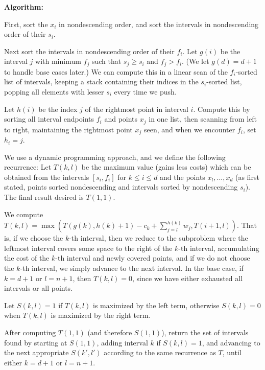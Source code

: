 \documentclass[letterpaper,12pt]{article}
\begin{document}
\vspace{2mm}
\textbf{Algorithm:}

First, sort the $x_i$ in nondescending order, and sort the intervals in
nondescending order of their $s_i$.

Next sort the intervals in nondescending order of their $f_i$. Let $g(i)$ be the
interval $j$ with minimum $f_j$ such that $s_j \geq s_i$ and $f_j > f_i$. (We let
$g(d) = d + 1$ to handle base cases later.) We can compute this in a linear scan
of the $f_i$-sorted list of intervals, keeping a stack containing their indices
in the $s_i$-sorted list, popping all elements with lesser $s_i$ every time we
push.

Let $h(i)$ be the index $j$ of the rightmost point in interval $i$. Compute this
by sorting all interval endpoints $f_i$ and points $x_j$ in one list, then
scanning from left to right, maintaining the rightmost point $x_j$ seen, and
when we encounter $f_i$, set $h_i = j$.


We use a dynamic programming approach, and we define the following recurrence:
Let $T(k, l)$ be the maximum value (gains less costs) which can be obtained from
the intervals $[s_i,f_i]$ for $k \leq i \leq d$ and the points ${x_l,...,x_d}$ (as
first stated, points sorted nondescending and intervals sorted by nondescending
$s_i$). The final result desired is $T(1,1)$.

We compute $T(k,l) = \max (T(g(k), h(k) + 1) - c_k + \sum_{j=l}^{h(k)} w_j, T(i+1,
l))$. That is, if we choose the $k$-th interval, then we reduce to the
subproblem where the leftmost interval covers some space to the right of the
$k$-th interval, accumulating the cost of the $k$-th interval and newly covered
points, and if we do not choose the $k$-th interval, we simply advance to the
next interval. In the base case, if $k = d + 1$ or $l = n + 1$, then $T(k,l) =
0$, since we have either exhausted all intervals or all points.

Let $S(k,l) = 1$ if $T(k,l)$ is maximized by the left term, otherwise $S(k,l) =
0$ when $T(k,l)$ is maximized by the right term.

After computing $T(1,1)$ (and therefore $S(1,1)$), return the set of intervals
found by starting at $S(1,1)$, adding interval $k$ if $S(k,l) = 1$, and
advancing to the next appropriate $S(k',l')$ according to the same recurrence as
$T$, until either $k = d + 1$ or $l = n + 1$.
\end{document}
